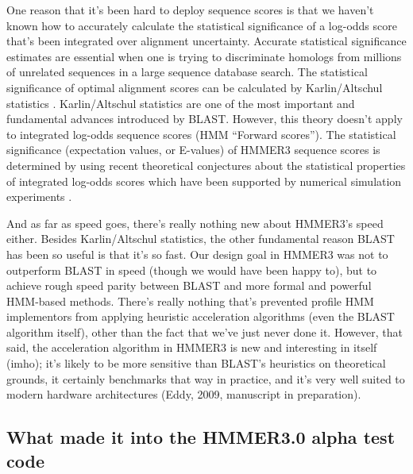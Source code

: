 One reason that it's been hard to deploy sequence scores is that we
haven't known how to accurately calculate the statistical significance
of a log-odds score that's been integrated over alignment
uncertainty. Accurate statistical significance estimates are essential
when one is trying to discriminate homologs from millions of unrelated
sequences in a large sequence database search. The statistical
significance of optimal alignment scores can be calculated by
Karlin/Altschul statistics
\citep{Karlin90,KarlinAltschul93}. Karlin/Altschul statistics are one
of the most important and fundamental advances introduced by BLAST.
However, this theory doesn't apply to integrated log-odds sequence
scores (HMM ``Forward scores'').  The statistical significance
(expectation values, or E-values) of HMMER3 sequence scores is
determined by using recent theoretical conjectures about the
statistical properties of integrated log-odds scores which have been
supported by numerical simulation experiments \citep{Eddy08}.

And as far as speed goes, there's really nothing new about HMMER3's
speed either. Besides Karlin/Altschul statistics, the other
fundamental reason BLAST has been so useful is that it's so fast.  Our
design goal in HMMER3 was not to outperform BLAST in speed (though we
would have been happy to), but to achieve rough speed parity between
BLAST and more formal and powerful HMM-based methods. There's really
nothing that's prevented profile HMM implementors from applying
heuristic acceleration algorithms (even the BLAST algorithm itself),
other than the fact that we've just never done it. However, that said,
the acceleration algorithm in HMMER3 is new and interesting in itself
(imho); it's likely to be more sensitive than BLAST's heuristics on
theoretical grounds, it certainly benchmarks that way in practice, and
it's very well suited to modern hardware architectures (Eddy, 2009,
manuscript in preparation). 



\subsection{What made it into the HMMER3.0 alpha test code}

